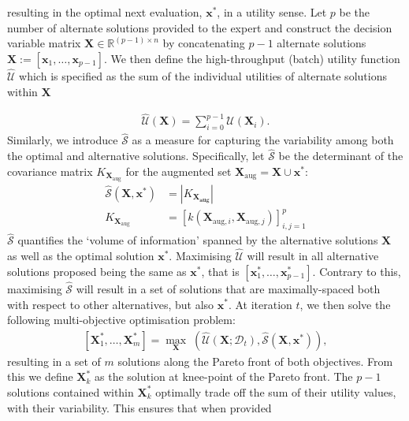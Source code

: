 \documentclass[
  letterpaper,
  DIV=11,
  numbers=noendperiod,
  oneside]{scrartcl}
\begin{document}
resulting in the optimal next evaluation, \(\mathbf{x}^*\), in a utility
sense. Let \(p\) be the number of alternate solutions provided to the
expert and construct the decision variable matrix
\(\mathbf{X} \in \mathbb{R}^{(p-1)\times n}\) by concatenating \(p-1\)
alternate solutions
\(\mathbf{X} := [\mathbf{x}_1,\dots,\mathbf{x}_{p-1}]\). We then define
the high-throughput (batch) utility function \(\hat{\mathcal{U}}\) which
is specified as the sum of the individual utilities of alternate
solutions within \(\mathbf{X}\)

\begin{align}
    \hat{\mathcal{U}}(\mathbf{X}) = \sum_{i=0}^{p-1} \mathcal{U}(\mathbf{X}_i).
\end{align} Similarly, we introduce \(\hat{\mathcal{S}}\) as a measure
for capturing the variability among both the optimal and alternative
solutions. Specifically, let \(\hat{\mathcal{S}}\) be the determinant of
the covariance matrix \(K_{\mathbf{X}_{\text{aug}}}\) for the augmented
set \(\mathbf{X}_{\text{aug}}= \mathbf{X} \cup \mathbf{x}^*\):
\begin{align*}
 \hat{\mathcal{S}}(\mathbf{X},\mathbf{x}^*) &= |K_{\mathbf{X_{\text{aug}}}}| \\
 K_{\mathbf{X}_{\text{aug}}} &= [k(\mathbf{X}_{\text{aug},i},\mathbf{X}_{\text{aug},j})]^p_{i,j=1}
\end{align*} \(\hat{\mathcal{S}}\) quantifies the `volume of
information' spanned by the alternative solutions \(\mathbf{X}\) as well
as the optimal solution \(\mathbf{x}^*\). Maximising
\(\hat{\mathcal{U}}\) will result in all alternative solutions proposed
being the same as \(\mathbf{x}^*\), that is
\([\mathbf{x}^*_1,\dots,\mathbf{x}^*_{p-1}]\). Contrary to this,
maximising \(\hat{\mathcal{S}}\) will result in a set of solutions that
are maximally-spaced both with respect to other alternatives, but also
\(\mathbf{x}^*\). At iteration \(t\), we then solve the following
multi-objective optimisation problem:
\begin{align}\label{multi-objective}
    [\mathbf{X}^*_1,\dots,\mathbf{X}^*_m] = \max_{\mathbf{X}} \; \left(\hat{\mathcal{U}}(\mathbf{X};\mathcal{D}_t),\hat{\mathcal{S}}(\mathbf{X},\mathbf{x}^*)\right),
\end{align} resulting in a set of \(m\) solutions along the Pareto front
of both objectives. From this we define \(\mathbf{X}^*_{k}\) as the
solution at knee-point of the Pareto front. The \(p-1\) solutions
contained within \(\mathbf{X}^*_k\) optimally trade off the sum of their
utility values, with their variability. This ensures that when provided
\end{document}
